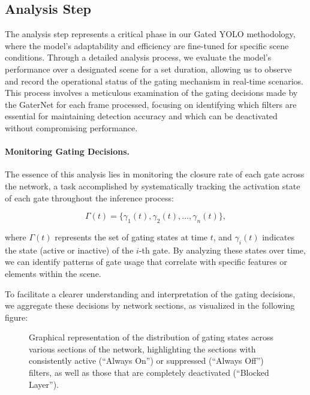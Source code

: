 \subsection{Analysis Step}

The analysis step represents a critical phase in our Gated YOLO methodology, where the model's adaptability and efficiency are fine-tuned for specific scene conditions. Through a detailed analysis process, we evaluate the model's performance over a designated scene for a set duration, allowing us to observe and record the operational status of the gating mechanism in real-time scenarios. This process involves a meticulous examination of the gating decisions made by the GaterNet for each frame processed, focusing on identifying which filters are essential for maintaining detection accuracy and which can be deactivated without compromising performance.

\paragraph{Monitoring Gating Decisions.} The essence of this analysis lies in monitoring the closure rate of each gate across the network, a task accomplished by systematically tracking the activation state of each gate throughout the inference process:

\begin{equation}
\Gamma(t) = \{\gamma_{1}(t), \gamma_{2}(t), \ldots, \gamma_{n}(t)\},
\label{eq:gating_states_time}
\end{equation}

\noindent{}where \(\Gamma(t)\) represents the set of gating states at time \(t\), and \(\gamma_{i}(t)\) indicates the state (active or inactive) of the \(i\)-th gate. By analyzing these states over time, we can identify patterns of gate usage that correlate with specific features or elements within the scene.

To facilitate a clearer understanding and interpretation of the gating decisions, we aggregate these decisions by network sections, as visualized in the following figure:

\begin{figure}[htbp]
\centering

\caption{Graphical representation of the distribution of gating states across various sections of the network, highlighting the sections with consistently active (``Always On'') or suppressed (``Always Off'') filters, as well as those that are completely deactivated (``Blocked Layer'').}
\label{fig:gating_analysis}
\end{figure}

